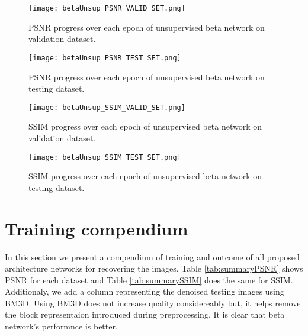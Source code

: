\begin{figure}[!htb]
\centering 
\texttt{[image: betaUnsup\_PSNR\_VALID\_SET.png]} 
\caption[PSNR validation progress during training of unsupervised beta network]{PSNR progress over each epoch of unsupervised beta network on validation dataset.}
\label{fig:betaUnsupValidPSNR} 
\end{figure}  

\begin{figure}[!htb] 
\centering 
\texttt{[image: betaUnsup\_PSNR\_TEST\_SET.png]} 
\caption[PSNR testing progress during training of unsupervised beta network]{PSNR progress over each epoch of unsupervised beta network on testing dataset.}
\label{fig:betaUnsupTestPSNR} 
\end{figure}  

\begin{figure}[!htb] 
\centering 
\texttt{[image: betaUnsup\_SSIM\_VALID\_SET.png]} 
\caption[SSIM validation progress during training of unsupervised beta network]{SSIM progress over each epoch of unsupervised beta network on validation dataset.}
\label{fig:betaUnsupValidSSIM} 
\end{figure}  

\begin{figure}[!htb] 
\centering 
\texttt{[image: betaUnsup\_SSIM\_TEST\_SET.png]} 
\caption[SSIM testing progress during training of unsupervised beta network]{SSIM progress over each epoch of unsupervised beta network on testing dataset.}
\label{fig:betaUnsupTestSSIM} 
\end{figure}  

\FloatBarrier

\section{Training compendium}

In this section we present a compendium of training and outcome of all proposed architecture networks for recovering the images. Table \ref{tab:summaryPSNR} shows PSNR for each dataset and Table \ref{tab:summarySSIM} does the same for SSIM. Additionaly, we add a column representing the denoised testing images using BM3D\cite{dabov2007image}. Using BM3D does not increase quality considereably but, it helps remove the block representaion introduced during preprocessing. It is clear that beta network's performnce is better. 

